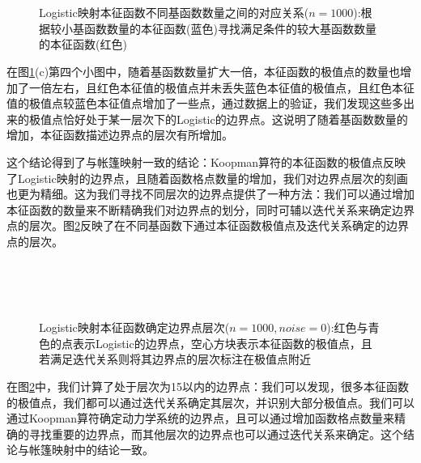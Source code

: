 \begin{figure}[!]
  \centering
    \\
    \\
  \caption[Logistic映射本征函数不同基函数数量之间的对应关系]{Logistic映射本征函数不同基函数数量之间的对应关系($n=1000$):根据较小基函数数量的本征函数(蓝色)寻找满足条件的较大基函数数量的本征函数(红色)}\label{fig:Logistic_findeigen_m8m16}
\end{figure}

在图\ref{fig:Logistic_findeigen_m8m16}(c)第四个小图中，随着基函数数量扩大一倍，本征函数的极值点的数量也增加了一倍左右，且红色本征值的极值点并未丢失蓝色本征值的极值点，且红色本征值的极值点较蓝色本征值点增加了一些点，通过数据上的验证，我们发现这些多出来的极值点恰好处于某一层次下的Logistic的边界点。这说明了随着基函数数量的增加，本征函数描述边界点的层次有所增加。

这个结论得到了与帐篷映射一致的结论：Koopman算符的本征函数的极值点反映了Logistic映射的边界点，且随着函数格点数量的增加，我们对边界点层次的刻画也更为精细。这为我们寻找不同层次的边界点提供了一种方法：我们可以通过增加本征函数的数量来不断精确我们对边界点的划分，同时可辅以迭代关系来确定边界点的层次。图\ref{fig:Logistic_auto_level_n1000_m4}反映了在不同基函数下通过本征函数极值点及迭代关系确定的边界点的层次。

\begin{figure}[!]
  \centering
    \\
    \\
    \\
  \caption[Logistic映射本征函数确定边界点层次]{Logistic映射本征函数确定边界点层次($n=1000,noise=0$):红色与青色的点表示Logistic的边界点，空心方块表示本征函数的极值点，且若满足迭代关系则将其边界点的层次标注在极值点附近}\label{fig:Logistic_auto_level_n1000_m4}
\end{figure}
在图\ref{fig:Logistic_auto_level_n1000_m4}中，我们计算了处于层次为15以内的边界点：我们可以发现，很多本征函数的极值点，我们都可以通过迭代关系确定其层次，并识别大部分极值点。我们可以通过Koopman算符确定动力学系统的边界点，且可以通过增加函数格点数量来精确的寻找重要的边界点，而其他层次的边界点也可以通过迭代关系来确定。这个结论与帐篷映射中的结论一致。



